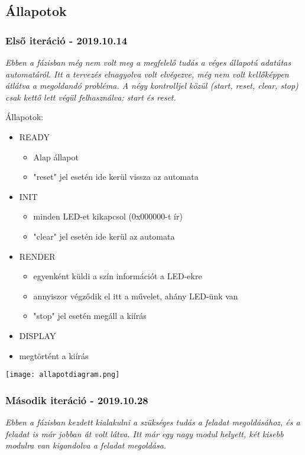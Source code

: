 \subsection{Állapotok}

\subsubsection{Első iteráció - 2019.10.14}

\tab \textit{Ebben a fázisban még nem volt meg a megfelelő tudás a véges állapotú adatútas automatáról.
Itt a tervezés elnagyolva volt elvégezve, még nem volt kellőképpen átlátva a megoldandó probléma. A négy kontrolljel közül (start, reset, clear, stop)
csak kettő lett végül felhasználva: start és reset.}

Állapotok:
\begin{itemize}
\item READY
	\begin{itemize}
	\item Alap állapot 
	\item "reset" jel esetén ide kerül vissza az automata
	\end{itemize}
\item INIT
	\begin{itemize}
	\item minden LED-et kikapcsol (0x000000-t ír)
	\item "clear" jel esetén ide kerül az automata
	\end{itemize}
\item RENDER
	\begin{itemize}
	\item egyenként küldi a szín információt a LED-ekre
	\item annyiszor végződik el itt a művelet, ahány LED-ünk van
	\item "stop" jel esetén megáll a kiírás
	\end{itemize}
\item DISPLAY
	\item megtörtént a kiírás
\end{itemize}

\texttt{[image: allapotdiagram.png]}

\subsubsection{Második iteráció - 2019.10.28}

\tab \textit{Ebben a fázisban kezdett kialakulni a szükséges tudás a feladat megoldásához, és a feladat is már jobban át volt látva. Itt már egy nagy modul helyett, két kisebb modulra van kigondolva
a feladat megoldása.}

